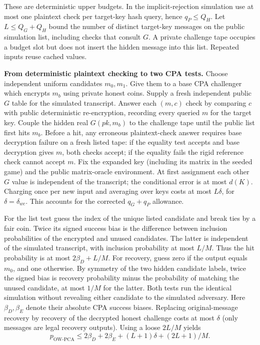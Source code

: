 \documentclass[
  11pt,
  a4paper,
  oneside]{report}
\begin{document}
These are deterministic upper budgets. In the implicit-rejection
simulation use at most one plaintext check per target-key hash query,
hence \(q_P\le Q_H\). Let \(L\le Q_G+Q_H\) bound the number of distinct
target-key messages on the public simulation list, including checks that
consult \(G\). A private challenge tape occupies a budget slot but does
not insert the hidden message into this list. Repeated inputs reuse
cached values.

\textbf{From deterministic plaintext checking to two CPA tests.} Choose
independent uniform candidates \(m_0,m_1\). Give them to a base CPA
challenger which encrypts \(m_b\) using private honest coins. Supply a
fresh independent public \(G\) table for the simulated transcript.
Answer each \((m,c)\) check by comparing \(c\) with public deterministic
re-encryption, recording every queried \(m\) for the target key. Couple
the hidden real \(G(pk,m_b)\) to the challenge tape until the public
list first hits \(m_b\). Before a hit, any erroneous plaintext-check
answer requires base decryption failure on a fresh listed tape: if the
equality test accepts and base decryption gives \(m\), both checks
accept; if the equality fails the rigid reference check cannot accept
\(m\). Fix the expanded key (including its matrix in the seeded game)
and the public matrix-oracle environment. At first assignment each other
\(G\) value is independent of the transcript; the conditional error is
at most \(d(K)\). Charging once per new input and averaging over keys
costs at most \(L\delta\), for \(\delta=\delta_{wc}\). This accounts for
the corrected \(q_G+q_P\) allowance.

For the list test guess the index of the unique listed candidate and
break ties by a fair coin. Twice its signed success bias is the
difference between inclusion probabilities of the encrypted and unused
candidates. The latter is independent of the simulated transcript, with
inclusion probability at most \(L/M\). Thus the hit probability is at
most \(2\beta_D+L/M\). For recovery, guess zero if the output equals
\(m_0\), and one otherwise. By symmetry of the two hidden candidate
labels, twice the signed bias is recovery probability minus the
probability of matching the unused candidate, at most \(1/M\) for the
latter. Both tests run the identical simulation without revealing either
candidate to the simulated adversary. Here \(\beta_D,\beta_E\) denote
their absolute CPA success biases. Replacing original-message recovery
by recovery of the decrypted honest challenge costs at most \(\delta\)
(only messages are legal recovery outputs). Using a loose \(2L/M\)
yields \[
p_{\mathrm{OW\text{-}PCA}}\le 2\beta_D+2\beta_E+(L+1)\delta+(2L+1)/M.
\]
\end{document}
